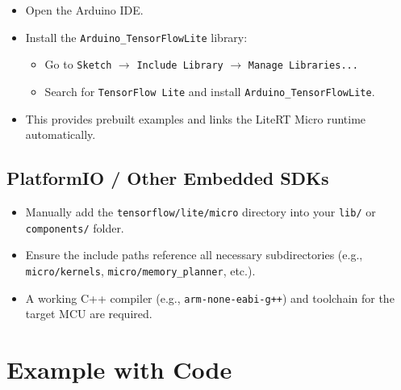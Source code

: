 \begin{itemize}

	\item Open the Arduino IDE.

	\item Install the \texttt{Arduino\_TensorFlowLite} library:

	\begin{itemize}

		\item Go to \texttt{Sketch} $\rightarrow$ \texttt{Include Library} $\rightarrow$ \texttt{Manage Libraries...}

		\item Search for \texttt{TensorFlow Lite} and install \texttt{Arduino\_TensorFlowLite}.

	\end{itemize}

	\item This provides prebuilt examples and links the LiteRT Micro runtime automatically.

\end{itemize}



\subsection{PlatformIO / Other Embedded SDKs}



\begin{itemize}

	\item Manually add the \texttt{tensorflow/lite/micro} directory into your \texttt{lib/} or \texttt{components/} folder.

	\item Ensure the include paths reference all necessary subdirectories (e.g., \texttt{micro/kernels}, \texttt{micro/memory\_planner}, etc.).

	\item A working C++ compiler (e.g., \texttt{arm-none-eabi-g++}) and toolchain for the target MCU are required.

\end{itemize}



\section{Example with Code}



